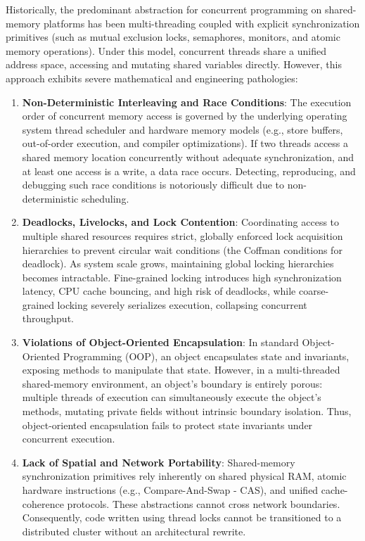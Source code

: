 Historically, the predominant abstraction for concurrent programming on shared-memory platforms has been multi-threading coupled with explicit synchronization primitives (such as mutual exclusion locks, semaphores, monitors, and atomic memory operations). Under this model, concurrent threads share a unified address space, accessing and mutating shared variables directly. However, this approach exhibits severe mathematical and engineering pathologies:
\begin{enumerate}
    \item \textbf{Non-Deterministic Interleaving and Race Conditions}: The execution order of concurrent memory access is governed by the underlying operating system thread scheduler and hardware memory models (e.g., store buffers, out-of-order execution, and compiler optimizations). If two threads access a shared memory location concurrently without adequate synchronization, and at least one access is a write, a data race occurs. Detecting, reproducing, and debugging such race conditions is notoriously difficult due to non-deterministic scheduling.
    \item \textbf{Deadlocks, Livelocks, and Lock Contention}: Coordinating access to multiple shared resources requires strict, globally enforced lock acquisition hierarchies to prevent circular wait conditions (the Coffman conditions for deadlock). As system scale grows, maintaining global locking hierarchies becomes intractable. Fine-grained locking introduces high synchronization latency, CPU cache bouncing, and high risk of deadlocks, while coarse-grained locking severely serializes execution, collapsing concurrent throughput.
    \item \textbf{Violations of Object-Oriented Encapsulation}: In standard Object-Oriented Programming (OOP), an object encapsulates state and invariants, exposing methods to manipulate that state. However, in a multi-threaded shared-memory environment, an object's boundary is entirely porous: multiple threads of execution can simultaneously execute the object's methods, mutating private fields without intrinsic boundary isolation. Thus, object-oriented encapsulation fails to protect state invariants under concurrent execution.
    \item \textbf{Lack of Spatial and Network Portability}: Shared-memory synchronization primitives rely inherently on shared physical RAM, atomic hardware instructions (e.g., Compare-And-Swap - CAS), and unified cache-coherence protocols. These abstractions cannot cross network boundaries. Consequently, code written using thread locks cannot be transitioned to a distributed cluster without an architectural rewrite.
\end{enumerate}

